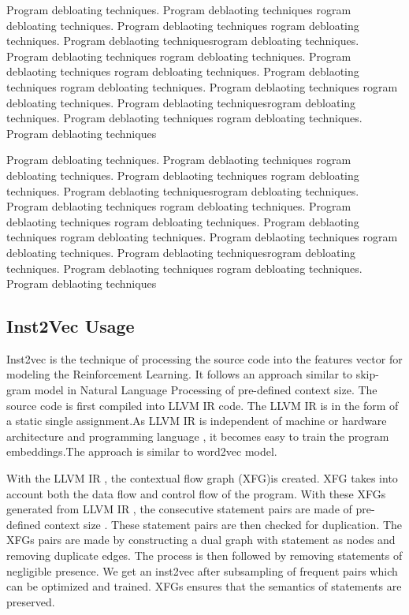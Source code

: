 \documentclass{relatorio}
\begin{document}
Program debloating techniques. Program deblaoting techniques rogram debloating techniques. Program deblaoting techniques
rogram debloating techniques. Program deblaoting techniquesrogram debloating techniques. Program deblaoting techniques
rogram debloating techniques. Program deblaoting techniques rogram debloating techniques. Program deblaoting techniques
rogram debloating techniques. Program deblaoting techniques 
rogram debloating techniques. Program deblaoting techniquesrogram debloating techniques. Program deblaoting techniques
rogram debloating techniques. Program deblaoting techniques

Program debloating techniques. Program deblaoting techniques rogram debloating techniques. Program deblaoting techniques
rogram debloating techniques. Program deblaoting techniquesrogram debloating techniques. Program deblaoting techniques
rogram debloating techniques. Program deblaoting techniques rogram debloating techniques. Program deblaoting techniques
rogram debloating techniques. Program deblaoting techniques 
rogram debloating techniques. Program deblaoting techniquesrogram debloating techniques. Program deblaoting techniques
rogram debloating techniques. Program deblaoting techniques	

\subsection{Inst2Vec Usage}%
\label{Tools}

Inst2vec  is the technique of processing the source code into the features vector for modeling the Reinforcement Learning. It follows an approach similar to skip-gram model in Natural Language Processing of pre-defined context size. The source code is first compiled into LLVM IR code. The LLVM IR is in the form of a static single assignment.As LLVM IR  is independent of machine or hardware architecture and programming language , it becomes easy to train the program embeddings.The approach is similar to word2vec model.


With the LLVM IR , the contextual flow graph (XFG)is created. XFG takes into account both the data flow and control flow of the program. With these XFGs generated from LLVM IR , the consecutive statement pairs are made of pre-defined context size . These statement pairs are then  checked for duplication. The XFGs pairs are made by constructing a dual graph with statement as nodes and removing duplicate edges. The process is then followed by removing statements of negligible presence. We get an inst2vec after subsampling of frequent pairs which can be optimized and trained. XFGs ensures that the semantics of statements are preserved.
\end{document}
